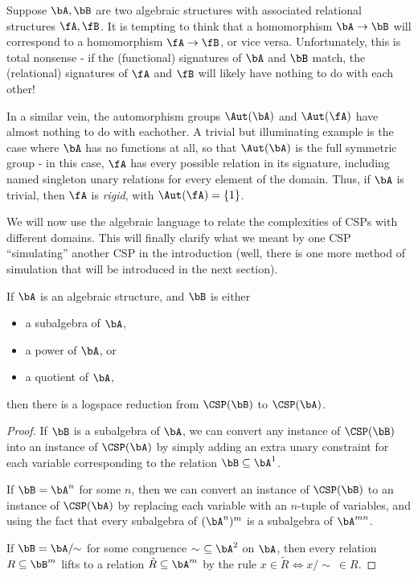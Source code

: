 \begin{rem} Suppose $\bA, \bB$ are two algebraic structures with associated relational structures $\fA, \fB$. It is tempting to think that a homomorphism $\bA \rightarrow \bB$ will correspond to a homomorphism $\fA \rightarrow \fB$, or vice versa. Unfortunately, this is total nonsense - if the (functional) signatures of $\bA$ and $\bB$ match, the (relational) signatures of $\fA$ and $\fB$ will likely have nothing to do with each other!

In a similar vein, the automorphism groups $\Aut(\bA)$ and $\Aut(\fA)$ have almost nothing to do with eachother. A trivial but illuminating example is the case where $\bA$ has no functions at all, so that $\Aut(\bA)$ is the full symmetric group - in this case, $\fA$ has every possible relation in its signature, including named singleton unary relations for every element of the domain. Thus, if $\bA$ is trivial, then $\fA$ is \emph{rigid}, with $\Aut(\fA) = \{1\}$.
\end{rem}

We will now use the algebraic language to relate the complexities of CSPs with different domains. This will finally clarify what we meant by one CSP ``simulating'' another CSP in the introduction (well, there is one more method of simulation that will be introduced in the next section).

\begin{thm} If $\bA$ is an algebraic structure, and $\bB$ is either
\begin{itemize}
\item a subalgebra of $\bA$,

\item a power of $\bA$, or

\item a quotient of $\bA$,
\end{itemize}
then there is a logspace reduction from $\CSP(\bB)$ to $\CSP(\bA)$.
\end{thm}
\begin{proof} If $\bB$ is a subalgebra of $\bA$, we can convert any instance of $\CSP(\bB)$ into an instance of $\CSP(\bA)$ by simply adding an extra unary constraint for each variable corresponding to the relation $\bB \subseteq \bA^1$.

If $\bB = \bA^n$ for some $n$, then we can convert an instance of $\CSP(\bB)$ to an instance of $\CSP(\bA)$ by replacing each variable with an $n$-tuple of variables, and using the fact that every subalgebra of $(\bA^n)^m$ is a subalgebra of $\bA^{mn}$.

If $\bB = \bA/\!\!\sim$ for some congruence $\sim\ \subseteq \bA^2$ on $\bA$, then every relation $R \subseteq \bB^m$ lifts to a relation $\tilde{R} \subseteq \bA^m$ by the rule $x \in \tilde{R} \iff x/\!\!\sim\ \in R$.
\end{proof}

